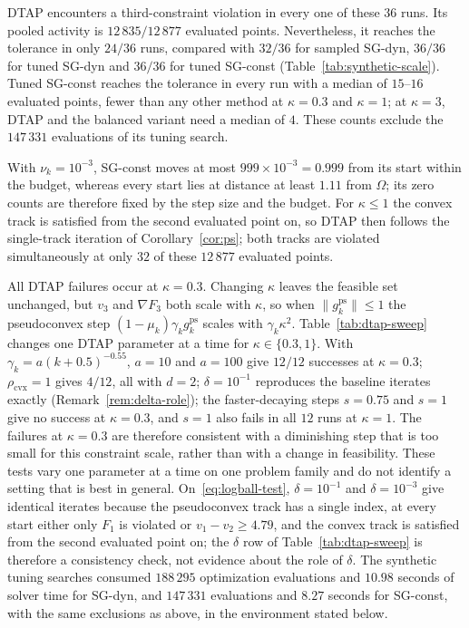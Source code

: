 \documentclass[]{interact}
\theoremstyle{plain}
\theoremstyle{definition}
\theoremstyle{remark}
\newcommand{\cvx}{\mathrm{cvx}}
\newcommand{\ps}{\mathrm{ps}}
\begin{document}
DTAP encounters a third-constraint violation in every one of these $36$
runs. Its pooled activity is $12\,835/12\,877$ evaluated points.
Nevertheless, it reaches the tolerance in only $24/36$ runs, compared
with $32/36$ for sampled SG-dyn, $36/36$ for tuned SG-dyn and $36/36$ for tuned
SG-const (Table~\ref{tab:synthetic-scale}).
Tuned SG-const reaches the tolerance in every run with a median of $15$--$16$
evaluated points, fewer than any other method at $\kappa=0.3$ and $\kappa=1$; at
$\kappa=3$, DTAP and the balanced variant need a median of $4$. These counts
exclude the $147\,331$ evaluations of its tuning search.

With $\nu_k=10^{-3}$, SG-const moves at most $999\times10^{-3}=0.999$ from its start
within the budget, whereas every start lies at distance at least $1.11$ from
$\Omega$; its zero counts are therefore fixed by the step size and the budget.
For $\kappa\le1$ the convex track is satisfied from the second evaluated point on,
so DTAP then follows the single-track iteration of Corollary~\ref{cor:ps}; both tracks are
violated simultaneously at only $32$ of these $12\,877$ evaluated points.

All DTAP failures occur at $\kappa=0.3$. Changing $\kappa$ leaves the feasible set
unchanged, but $v_3$ and $\nabla F_3$ both scale with $\kappa$, so when
$\|g^{\ps}_k\|\le1$ the pseudoconvex step $(1-\mu_k)\gamma_k g^{\ps}_k$ scales with
$\gamma_k\kappa^2$. Table~\ref{tab:dtap-sweep} changes one DTAP parameter at a time
for $\kappa\in\{0.3,1\}$. With $\gamma_k=a(k+0.5)^{-0.55}$, $a=10$ and $a=100$ give
$12/12$ successes at $\kappa=0.3$; $\rho_{\cvx}=1$ gives $4/12$, all with $d=2$;
$\delta=10^{-1}$ reproduces the baseline iterates exactly (Remark~\ref{rem:delta-role}); the
faster-decaying steps $s=0.75$ and $s=1$ give no success at $\kappa=0.3$, and
$s=1$ also fails in all $12$ runs at $\kappa=1$. The failures at $\kappa=0.3$ are
therefore consistent with a diminishing step that is too small for this
constraint scale, rather than with a change in feasibility. These tests vary
one parameter at a time on one problem family and do not identify a setting
that is best in general.
On~\eqref{eq:logball-test}, $\delta=10^{-1}$ and $\delta=10^{-3}$ give identical iterates because
the pseudoconvex track has a single index, at every start either only $F_1$ is violated or
$v_1-v_2\ge4.79$, and the convex track is satisfied from the second evaluated point on; the
$\delta$ row of Table~\ref{tab:dtap-sweep} is therefore a consistency check, not evidence about
the role of $\delta$.
The synthetic tuning searches consumed $188\,295$ optimization evaluations and
$10.98$ seconds of solver time for SG-dyn, and $147\,331$ evaluations and $8.27$
seconds for SG-const, with the same exclusions as above, in the environment
stated below.
\end{document}
